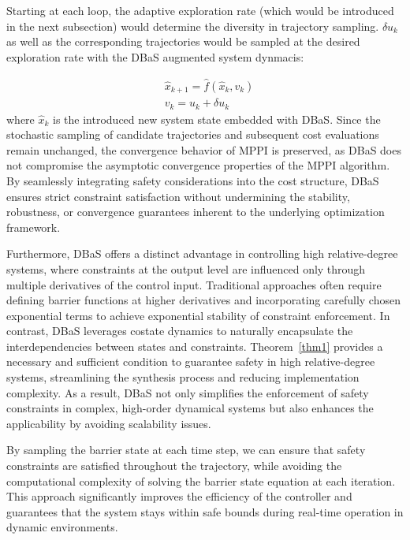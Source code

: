 \documentclass[english]{cccconf}
\begin{document}
Starting at each loop, the adaptive exploration rate (which would be introduced in the next subsection) would determine the diversity in trajectory sampling. $\delta u_k$ as well as the corresponding trajectories would be sampled at the desired exploration rate with the DBaS augmented system dynmacis:

\begin{equation}\label{eq:MPPI_BaS}
    \begin{aligned}
        &\hat{x}_{k+1} = \hat{f}(\hat{x}_k, v_k) \\
        &v_k = u_k + \delta u_k
    \end{aligned}
\end{equation}
where $\hat{x}_k$ is the introduced new system state embedded with DBaS. 
Since the stochastic sampling of candidate trajectories and subsequent cost evaluations remain unchanged, the convergence behavior of MPPI is preserved\cite{williams2018information}, as DBaS does not compromise the asymptotic convergence properties of the MPPI algorithm. By seamlessly integrating safety considerations into the cost structure, DBaS ensures strict constraint satisfaction without undermining the stability, robustness, or convergence guarantees inherent to the underlying optimization framework.

Furthermore, DBaS offers a distinct advantage in controlling high relative-degree systems, where constraints at the output level are influenced only through multiple derivatives of the control input. Traditional approaches often require defining barrier functions at higher derivatives and incorporating carefully chosen exponential terms to achieve exponential stability of constraint enforcement.
In contrast, DBaS leverages costate dynamics to naturally encapsulate the interdependencies between states and constraints. Theorem~\ref{thm1} provides a necessary and sufficient condition to guarantee safety in high relative-degree systems, streamlining the synthesis process and reducing implementation complexity. As a result, DBaS not only simplifies the enforcement of safety constraints in complex, high-order dynamical systems but also enhances the applicability by avoiding scalability issues.


By sampling the barrier state at each time step, we can ensure that safety constraints are satisfied throughout the trajectory, while avoiding the computational complexity of solving the barrier state equation at each iteration. This approach significantly improves the efficiency of the controller and guarantees that the system stays within safe bounds during real-time operation in dynamic environments.
\end{document}
